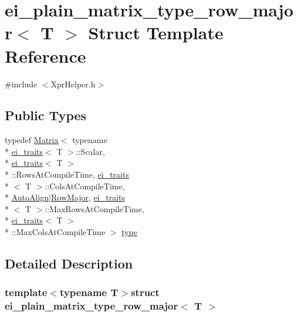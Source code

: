 \hypertarget{structei__plain__matrix__type__row__major}{\section{ei\-\_\-plain\-\_\-matrix\-\_\-type\-\_\-row\-\_\-major$<$ T $>$ Struct Template Reference}
\label{structei__plain__matrix__type__row__major}
}


{\ttfamily \#include $<$Xpr\-Helper.\-h$>$}

\subsection*{Public Types}
\begin{DoxyCompactItemize}
\item 
typedef \hyperlink{class_matrix}{Matrix}$<$ typename \\*
\hyperlink{structei__traits}{ei\-\_\-traits}$<$ T $>$\-::Scalar, \\*
\hyperlink{structei__traits}{ei\-\_\-traits}$<$ T $>$\\*
\-::Rows\-At\-Compile\-Time, \hyperlink{structei__traits}{ei\-\_\-traits}\\*
$<$ T $>$\-::Cols\-At\-Compile\-Time, \\*
\hyperlink{_constants_8h_a4d29ca5db06e2ae647d1ec22548a9d2aa02a97bb4792f98916a1156a521fa9813}{Auto\-Align}$|$\hyperlink{_constants_8h_a4d29ca5db06e2ae647d1ec22548a9d2aa1e16fa1b92ed7a058cd4ce7a9a0db044}{Row\-Major}, \hyperlink{structei__traits}{ei\-\_\-traits}\\*
$<$ T $>$\-::Max\-Rows\-At\-Compile\-Time, \\*
\hyperlink{structei__traits}{ei\-\_\-traits}$<$ T $>$\\*
\-::Max\-Cols\-At\-Compile\-Time $>$ \hyperlink{structei__plain__matrix__type__row__major_a0c895ed93a7f6fa5cbd3c308d539b9ce}{type}
\end{DoxyCompactItemize}


\subsection{Detailed Description}
\subsubsection*{template$<$typename T$>$struct ei\-\_\-plain\-\_\-matrix\-\_\-type\-\_\-row\-\_\-major$<$ T $>$}



